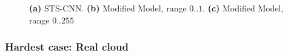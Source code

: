 \begin{figure}[]
	\centering
	\centering
	\caption{
		\textbf{(a)} STS-CNN.
		\textbf{(b)} Modified Model, range $0..1$.
		\textbf{(c)} Modified Model, range $0..255$}
	\label{fig:improvedModel_experiment_2}
\end{figure}

\subsubsection{Hardest case: Real cloud}

